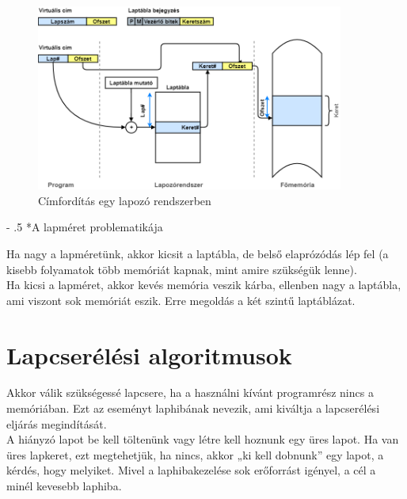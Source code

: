 \documentclass[tikz,12pt,margin=0px]{article}
\makeatletter
\renewcommand\paragraph{%
	\@startsection{paragraph}{4}{0mm}%
	{-\baselineskip}%
	{.5\baselineskip}%
	{\normalfont\normalsize\bfseries}}
\makeatother
\begin{document}
    \begin{figure}[H]
        \centering
        \includegraphics[width=0.9\textwidth]{img/paging_address_conversion.png}
        \caption{Címfordítás egy lapozó rendszerben}
        \label{paging_address_transformation}
    \end{figure}

    \paragraph*{A lapméret problematikája}

    \noindent Ha nagy a lapméretünk, akkor kicsit a laptábla, de belső elaprózódás lép fel (a kisebb folyamatok több memóriát kapnak, mint amire szükségük lenne).\\

    \noindent Ha kicsi a lapméret, akkor kevés memória veszik kárba, ellenben nagy a laptábla, ami viszont sok memóriát eszik. Erre megoldás a két szintű laptáblázat.

	\section*{Lapcserélési algoritmusok}
	
    Akkor válik szükségessé lapcsere, ha a használni kívánt programrész nincs a memóriában. Ezt az eseményt laphibának nevezik, ami kiváltja a lapcserélési eljárás megindítását.\\

   \noindent A hiányzó lapot be kell töltenünk vagy létre kell hoznunk egy üres lapot. Ha van üres lapkeret, ezt megtehetjük, ha nincs, akkor „ki kell dobnunk” egy lapot, a kérdés, hogy melyiket. Mivel a laphibakezelése sok erőforrást igényel, a cél a minél kevesebb laphiba.\\
\end{document}
